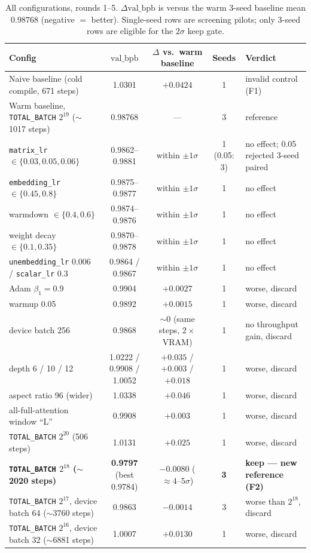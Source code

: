 \documentclass{article}
\newcommand{\valbpb}{\mathrm{val\_bpb}}
\begin{document}
\begin{table}[t]
\caption{All configurations, rounds 1--5. $\Delta\valbpb$ is versus the warm 3-seed baseline mean $0.98768$ (negative $=$ better). Single-seed rows are screening pilots; only 3-seed rows are eligible for the $2\sigma$ keep gate.}
\label{tab:results}
\vskip 0.15in
\begin{center}
\begin{small}
\begin{tabular}{lcccl}
\toprule
Config & $\valbpb$ & $\Delta$ vs.\ warm baseline & Seeds & Verdict \\
\midrule
Naive baseline (cold compile, 671 steps) & 1.0301 & $+0.0424$ & 1 & invalid control (F1) \\
Warm baseline, \texttt{TOTAL\_BATCH} $2^{19}$ ($\sim$1017 steps) & 0.98768 & --- & 3 & reference \\
\midrule
\texttt{matrix\_lr} $\in \{0.03, 0.05, 0.06\}$ & 0.9862--0.9881 & within $\pm 1\sigma$ & 1 (0.05: 3) & no effect; 0.05 rejected 3-seed paired \\
\texttt{embedding\_lr} $\in \{0.45, 0.8\}$ & 0.9875--0.9877 & within $\pm 1\sigma$ & 1 & no effect \\
warmdown $\in \{0.4, 0.6\}$ & 0.9874--0.9876 & within $\pm 1\sigma$ & 1 & no effect \\
weight decay $\in \{0.1, 0.35\}$ & 0.9870--0.9878 & within $\pm 1\sigma$ & 1 & no effect \\
\texttt{unembedding\_lr} 0.006 / \texttt{scalar\_lr} 0.3 & 0.9864 / 0.9867 & within $\pm 1\sigma$ & 1 & no effect \\
Adam $\beta_1 = 0.9$ & 0.9904 & $+0.0027$ & 1 & worse, discard \\
warmup 0.05 & 0.9892 & $+0.0015$ & 1 & worse, discard \\
device batch 256 & 0.9868 & $\sim 0$ (same steps, $2\times$ VRAM) & 1 & no throughput gain, discard \\
\midrule
depth 6 / 10 / 12 & 1.0222 / 0.9908 / 1.0052 & $+0.035$ / $+0.003$ / $+0.018$ & 1 & worse, discard \\
aspect ratio 96 (wider) & 1.0338 & $+0.046$ & 1 & worse, discard \\
all-full-attention window ``L'' & 0.9908 & $+0.003$ & 1 & worse, discard \\
\midrule
\texttt{TOTAL\_BATCH} $2^{20}$ (506 steps) & 1.0131 & $+0.025$ & 1 & worse, discard \\
\textbf{\texttt{TOTAL\_BATCH} $2^{18}$ ($\sim$2020 steps)} & \textbf{0.9797} (best 0.9784) & $-0.0080$ ($\approx 4$--$5\sigma$) & \textbf{3} & \textbf{keep --- new reference (F2)} \\
\texttt{TOTAL\_BATCH} $2^{17}$, device batch 64 ($\sim$3760 steps) & 0.9863 & $-0.0014$ & 3 & worse than $2^{18}$, discard \\
\texttt{TOTAL\_BATCH} $2^{16}$, device batch 32 ($\sim$6881 steps) & 1.0007 & $+0.0130$ & 1 & worse, discard \\
\bottomrule
\end{tabular}
\end{small}
\end{center}
\vskip -0.1in
\end{table}
\end{document}
